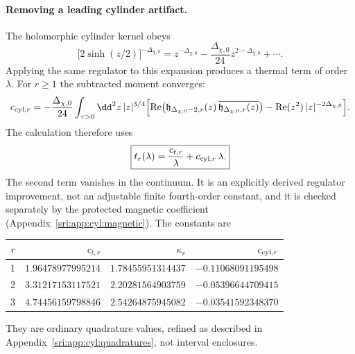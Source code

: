 \paragraph{Removing a leading cylinder artifact.} The holomorphic cylinder kernel obeys
\begin{equation}
 \bigl[2\sinh(z/2)\bigr]^{-\Delta_{\chi,0}}=z^{-\Delta_{\chi,0}}-\frac{\Delta_{\chi,0}}{24}z^{2-\Delta_{\chi,0}}+\cdots.
\end{equation}
Applying the same regulator to this expansion produces a thermal term of order $\lambda$. For $r\ge1$ the subtracted
moment converges:
\begin{equation}
 c_{{\rm cyl},r}=-\frac{\Delta_{\chi,0}}{24}\int_{\tau>0}\dd^2z\,|z|^{3/4}\Bigl[{\rm Re}\bigl(\mathfrak
 h_{\Delta_{\chi,0}-2,r}(z)\,\overline{\mathfrak h_{\Delta_{\chi,0},r}(z)}\bigr)-{\rm Re}(z^2)\,|z|^{-2\Delta_{\chi,0}}\Bigr].
\end{equation}
The calculation therefore uses
\begin{equation}
 \boxed{t_r(\lambda)=\frac{c_{t,r}}{\lambda}+c_{{\rm cyl},r}\,\lambda.}
 \label{sri:eq:cyl:tfinal}
\end{equation}
The second term vanishes in the continuum. It is an explicitly derived regulator improvement, not an adjustable finite
fourth-order constant, and it is checked separately by the protected magnetic coefficient
(Appendix~\ref{sri:app:cyl:magnetic}). The constants are
\begin{center}\small
\begin{tabular}{@{}rrrr@{}}
\toprule
$r$ & $c_{t,r}$ & $\kappa_r$ & $c_{{\rm cyl},r}$\\
\midrule
1 & $1.96478977995214$ & $1.78455951314437$ & $-0.11068091195498$\\
2 & $3.31217153117521$ & $2.20281564903759$ & $-0.05396644709415$\\
3 & $4.74456159798846$ & $2.54264875945082$ & $-0.03541592348370$\\
\bottomrule
\end{tabular}
\end{center}
They are ordinary quadrature values, refined as described in Appendix~\ref{sri:app:cyl:quadratures}, not interval enclosures.

